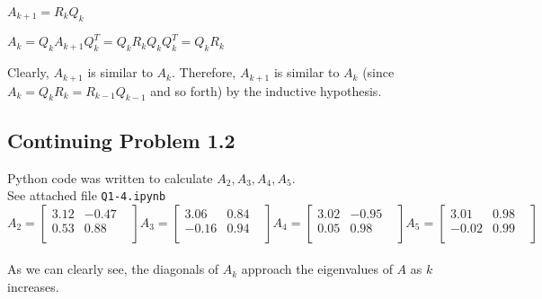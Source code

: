 \documentclass[12pt]{article}
\begin{document}
$A_{k+1} = R_kQ_k$ 

$A_k = Q_k A_{k+1} Q_k^T  =  Q_k R_kQ_k Q_k^T = Q_k R_k$

Clearly, $A_{k+1}$ is similar to $A_k$. Therefore, $A_{k+1}$ is similar to $A_k$ (since $A_k = Q_kR_k = R_{k-1}Q_{k-1}$ and so forth) by the inductive hypothesis.



\subsection{Continuing Problem  1.2}
Python code was written to calculate $A_2, A_3, A_4, A_5$. \\
See attached file \texttt{Q1-4.ipynb}
\\
$$
A_2 = \begin{bmatrix}
3.12 & -0.47 & \\
0.53 & 0.88 & \\
\end{bmatrix}
A_3 = \begin{bmatrix}
3.06 & 0.84 & \\
-0.16 & 0.94 & \\
\end{bmatrix}
A_4 = \begin{bmatrix}
3.02 & -0.95 & \\
0.05 & 0.98 & \\
\end{bmatrix}
A_5 = \begin{bmatrix}
3.01 & 0.98 & \\
-0.02 & 0.99 & \\
\end{bmatrix}
$$ \\ 

As we can clearly see, the diagonals of $A_k$ approach the eigenvalues of $A$ as $k$ increases.
\end{document}
